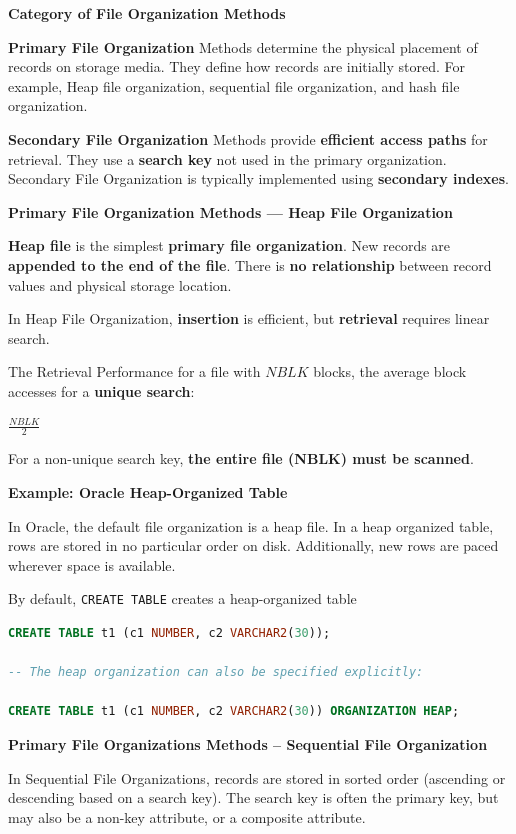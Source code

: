 \documentclass[11pt]{article}
\newcommand{\vs}[]{
    \vspace{11pt}
}
\newcommand{\myeq}[1]{
    \vspace{11pt}
    \begin{center}
        ${#1}$
    \end{center}
    \vspace{11pt}
}
\newcommand{\boldsec}[1]{
    \vspace{11pt}
    \textbf{#1}
    \vspace{11pt}
}
\begin{document}
\boldsec{Category of File Organization Methods}

\textbf{Primary File Organization} Methods determine the physical placement of records on storage media. They define how records are initially stored. For example, Heap file organization, sequential file organization, and hash file organization.

\textbf{Secondary File Organization} Methods provide \textbf{efficient access paths} for retrieval. They use a \textbf{search key} not used in the primary organization. Secondary File Organization is typically implemented using \textbf{secondary indexes}.

\boldsec{Primary File Organization Methods --- Heap File Organization}

\textbf{Heap file} is the simplest \textbf{primary file organization}. New records are \textbf{appended to the end of the file}. There is \textbf{no relationship} between record values and physical storage location.

In Heap File Organization, \textbf{insertion} is efficient, but \textbf{retrieval} requires linear search.

The Retrieval Performance for a file with $NBLK$ blocks, the average block accesses for a\textbf{ unique search}:

\myeq{\frac{NBLK}{2}}

For a non-unique search key, \textbf{the entire file (NBLK) must be scanned}.

\boldsec{Example: Oracle Heap-Organized Table}

In Oracle, the default file organization is a heap file. In a heap organized table, rows are stored in no particular order on disk. Additionally, new rows are paced wherever space is available.

By default, \texttt{CREATE TABLE} creates a heap-organized table

\vs
\begin{lstlisting}[language=sql, breaklines=true, showstringspaces=false]
CREATE TABLE t1 (c1 NUMBER, c2 VARCHAR2(30));

-- The heap organization can also be specified explicitly:

CREATE TABLE t1 (c1 NUMBER, c2 VARCHAR2(30)) ORGANIZATION HEAP;
\end{lstlisting}
\vs

\boldsec{Primary File Organizations Methods -- Sequential File Organization}

In Sequential File Organizations, records are stored in sorted order (ascending or descending based on a search key). The search key is often the primary key, but may also be a non-key attribute, or a composite attribute.
\end{document}
